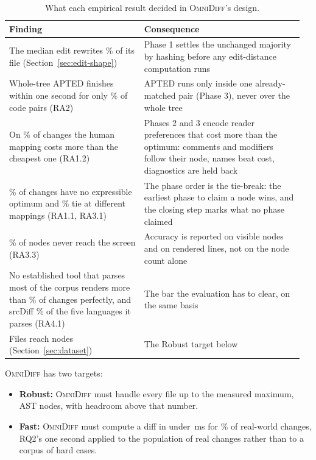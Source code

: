 \documentclass[sigconf]{acmart}
\begin{document}
\begin{table}
  \caption{What each empirical result decided in \textsc{OmniDiff}'s design.}
  \label{tab:findings-to-design}
  \small
  \begin{tabular}{@{}>{\raggedright\arraybackslash}p{0.44\linewidth}>{\raggedright\arraybackslash}p{0.52\linewidth}@{}}
    \toprule
    Finding & Consequence \\
    \midrule
    The median edit rewrites \EditsChurnPFiftyPct{}\% of its file (Section~\ref{sec:edit-shape})
      & Phase 1 settles the unchanged majority by hashing before any edit-distance computation
        runs \\ \addlinespace
    Whole-tree APTED finishes within one second for only \RqOneCodePct{}\% of code pairs (RA2)
      & APTED runs only inside one already-matched pair (Phase 3), never over the whole tree \\ \addlinespace
    On \CostHumanHigherPct{}\% of changes the human mapping costs more than the cheapest one
      (RA1.2)
      & Phases 2 and 3 encode reader preferences that cost more than the optimum: comments and
        modifiers follow their node, names beat cost, diagnostics are held back \\ \addlinespace
    \AmbiguityListPct{}\% of changes have no expressible optimum and \CostTieDifferentPct{}\%
      tie at different mappings (RA1.1, RA3.1)
      & The phase order is the tie-break: the earliest phase to claim a node wins, and the
        closing step marks what no phase claimed \\ \addlinespace
    \InvisibleNodeShare{}\% of nodes never reach the screen (RA3.3)
      & Accuracy is reported on visible nodes and on rendered lines, not on the node count alone \\ \addlinespace
    No established tool that parses most of the corpus renders more than
      \DifftasticPerfectPct{}\% of changes perfectly, and srcDiff \SrcDiffPerfectPct{}\% of the
      five languages it parses (RA4.1)
      & The bar the evaluation has to clear, on the same basis \\ \addlinespace
    Files reach \AstMax{} nodes (Section~\ref{sec:dataset})
      & The Robust target below \\
    \bottomrule
  \end{tabular}
\end{table}

\textsc{OmniDiff} has two targets:

\begin{itemize}
  \item \textbf{Robust:} \textsc{OmniDiff} must handle every file up to the measured maximum,
    \AstMax{} AST nodes, with headroom above that number.
  \item \textbf{Fast:} \textsc{OmniDiff} must compute a diff in under \SpeedTargetMs{}\,ms for
    \SpeedTargetPct{}\% of real-world changes, RQ2's one second applied to the population of
    real changes rather than to a corpus of hard cases.
\end{itemize}
\end{document}
